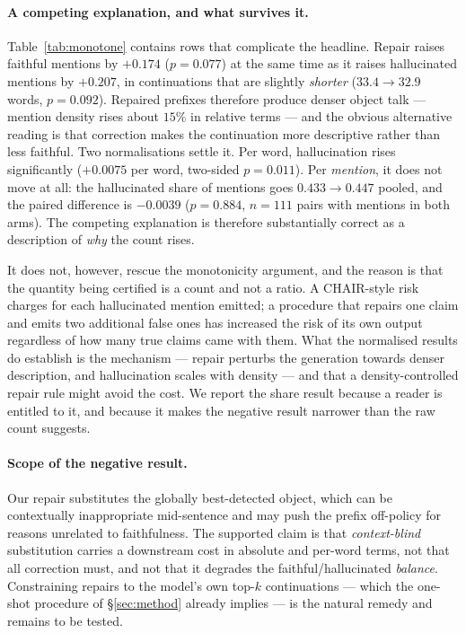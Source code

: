 \documentclass{article}
\theoremstyle{plain}
\theoremstyle{definition}
\theoremstyle{remark}
\begin{document}
\paragraph{A competing explanation, and what survives it.}
Table~\ref{tab:monotone} contains rows that complicate the headline. Repair raises
faithful mentions by $+0.174$ ($p=0.077$) at the same time as it raises hallucinated mentions by
$+0.207$, in continuations that are slightly \emph{shorter} ($33.4\to32.9$ words, $p=0.092$).
Repaired prefixes therefore produce denser object talk --- mention density rises about $15\%$ in
relative terms --- and the obvious alternative reading is that correction makes the continuation
more descriptive rather than less faithful. Two normalisations settle it. Per word, hallucination
rises significantly ($+0.0075$ per word, two-sided $p=0.011$). Per \emph{mention}, it does not
move at all: the hallucinated share of mentions goes $0.433\to0.447$ pooled, and the paired
difference is $-0.0039$ ($p=0.884$, $n=111$ pairs with mentions in both arms). The competing
explanation is therefore substantially correct as a description of \emph{why} the count rises.

It does not, however, rescue the monotonicity argument, and the reason is that the quantity
being certified is a count and not a ratio. A CHAIR-style risk charges for each hallucinated
mention emitted; a procedure that repairs one claim and emits two additional false ones has
increased the risk of its own output regardless of how many true claims came with them. What
the normalised results do establish is the mechanism --- repair perturbs the generation
towards denser description, and hallucination scales with density --- and that a
density-controlled repair rule might avoid the cost. We report the share result because a
reader is entitled to it, and because it makes the negative result narrower than the raw
count suggests.

\paragraph{Scope of the negative result.}
Our repair substitutes the globally best-detected object, which can be contextually
inappropriate mid-sentence and may push the prefix off-policy for reasons unrelated to
faithfulness. The supported claim is that \emph{context-blind} substitution carries a
downstream cost in absolute and per-word terms, not that all correction must, and not that
it degrades the faithful/hallucinated \emph{balance}. Constraining repairs to the model's
own top-$k$ continuations --- which the one-shot procedure of \S\ref{sec:method} already
implies --- is the natural remedy and remains to be tested.
\end{document}
